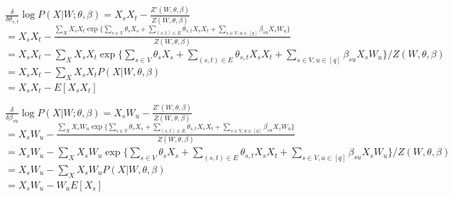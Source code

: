 \documentclass[12pt]{article}
\begin{document}
\begin{enumerate}
	$\frac{\delta}{\delta\theta_{s, t}}\log P(X \vert W; \theta, \beta) = X_sX_t - \frac{Z'(W, \theta, \beta)}{Z(W, \theta, \beta)}$\\
	$= X_sX_t - \frac{\sum_{X}X_sX_t\exp\Big\{\sum_{s\in V} \theta_sX_s + \sum_{(s, t)\in E} \theta_{s, t}X_sX_t + \sum_{s\in V, u\in [q]} \beta_{su}X_sW_u\Big\}}{Z(W, \theta, \beta)}$\\
	$= X_sX_t - \sum_{X}X_sX_t\exp\Big\{\sum_{s\in V} \theta_sX_s + \sum_{(s, t)\in E} \theta_{s, t}X_sX_t + \sum_{s\in V, u\in [q]} \beta_{su}X_sW_u\Big\}/Z(W, \theta, \beta)$\\
	$= X_sX_t - \sum_{X}X_sX_t P(X \vert W, \theta, \beta)$\\
	$= X_sX_t - E[X_sX_t]$
	
	$\frac{\delta}{\delta\beta_{su}}\log P(X \vert W; \theta, \beta) = X_sW_u - \frac{Z'(W, \theta, \beta)}{Z(W, \theta, \beta)}$\\
	$= X_sW_u - \frac{\sum_{X}X_sW_u\exp\Big\{\sum_{s\in V} \theta_sX_s + \sum_{(s, t)\in E} \theta_{s, t}X_sX_t + \sum_{s\in V, u\in [q]} \beta_{su}X_sW_u\Big\}}{Z(W, \theta, \beta)}$\\
	$= X_sW_u - \sum_{X}X_sW_u\exp\Big\{\sum_{s\in V} \theta_sX_s + \sum_{(s, t)\in E} \theta_{s, t}X_sX_t + \sum_{s\in V, u\in [q]} \beta_{su}X_sW_u\Big\}/Z(W, \theta, \beta)$\\
	$= X_sW_u - \sum_{X}X_sW_u P(X \vert W, \theta, \beta)$\\
	$= X_sW_u - W_uE[X_s]$\\
\end{enumerate}
\end{document}
